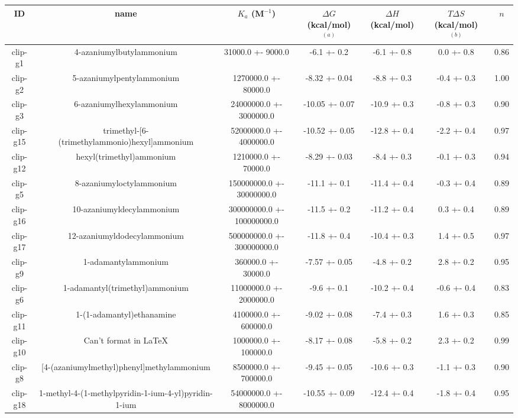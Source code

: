 \documentclass{article}
\begin{document}
\begin{center}
\footnotesize
\begin{tabu}{| c | c | c | c | c | c | c |}
\hline
\rowfont{\bfseries} ID & name & $K_a$ (M$^{-1}$) & $\Delta G$ (kcal/mol) $^{(a)}$ & $\Delta H$ (kcal/mol) & $T\Delta S$ (kcal/mol) $^{(b)}$ & $n$ \\
\hline
\hline
clip-g1 & 4-azaniumylbutylammonium & 31000.0 +- 9000.0 & -6.1 +- 0.2 & -6.1 +- 0.8 & 0.0 +- 0.8 &  0.86 \\
\hline
clip-g2 & 5-azaniumylpentylammonium & 1270000.0 +- 80000.0 & -8.32 +- 0.04 & -8.8 +- 0.3 & -0.4 +- 0.3 &  1.00 \\
\hline
clip-g3 & 6-azaniumylhexylammonium & 24000000.0 +- 3000000.0 & -10.05 +- 0.07 & -10.9 +- 0.3 & -0.8 +- 0.3 &  0.90 \\
\hline
clip-g15 & trimethyl-[6-(trimethylammonio)hexyl]ammonium & 52000000.0 +- 4000000.0 & -10.52 +- 0.05 & -12.8 +- 0.4 & -2.2 +- 0.4 &  0.97 \\
\hline
clip-g12 & hexyl(trimethyl)ammonium & 1210000.0 +- 70000.0 & -8.29 +- 0.03 & -8.4 +- 0.3 & -0.1 +- 0.3 &  0.94 \\
\hline
clip-g5 & 8-azaniumyloctylammonium & 150000000.0 +- 30000000.0 & -11.1 +- 0.1 & -11.4 +- 0.4 & -0.3 +- 0.4 &  0.89 \\
\hline
clip-g16 & 10-azaniumyldecylammonium & 300000000.0 +- 100000000.0 & -11.5 +- 0.2 & -11.2 +- 0.4 & 0.3 +- 0.4 &  0.89 \\
\hline
clip-g17 & 12-azaniumyldodecylammonium & 500000000.0 +- 300000000.0 & -11.8 +- 0.4 & -10.4 +- 0.3 & 1.4 +- 0.5 &  0.97 \\
\hline
clip-g9 & 1-adamantylammonium & 360000.0 +- 30000.0 & -7.57 +- 0.05 & -4.8 +- 0.2 & 2.8 +- 0.2 &  0.95 \\
\hline
clip-g6 & 1-adamantyl(trimethyl)ammonium & 11000000.0 +- 2000000.0 & -9.6 +- 0.1 & -10.2 +- 0.4 & -0.6 +- 0.4 &  0.83 \\
\hline
clip-g11 & 1-(1-adamantyl)ethanamine & 4100000.0 +- 600000.0 & -9.02 +- 0.08 & -7.4 +- 0.3 & 1.6 +- 0.3 &  0.85 \\
\hline
clip-g10 & Can't format in LaTeX & 1000000.0 +- 100000.0 & -8.17 +- 0.08 & -5.8 +- 0.2 & 2.3 +- 0.2 &  0.99 \\
\hline
clip-g8 & [4-(azaniumylmethyl)phenyl]methylammonium & 8500000.0 +- 700000.0 & -9.45 +- 0.05 & -10.6 +- 0.3 & -1.1 +- 0.3 &  0.90 \\
\hline
clip-g18 & 1-methyl-4-(1-methylpyridin-1-ium-4-yl)pyridin-1-ium & 54000000.0 +- 8000000.0 & -10.55 +- 0.09 & -12.4 +- 0.4 & -1.8 +- 0.4 &  0.95 \\

\end{tabu}
\end{center}
\end{document}
